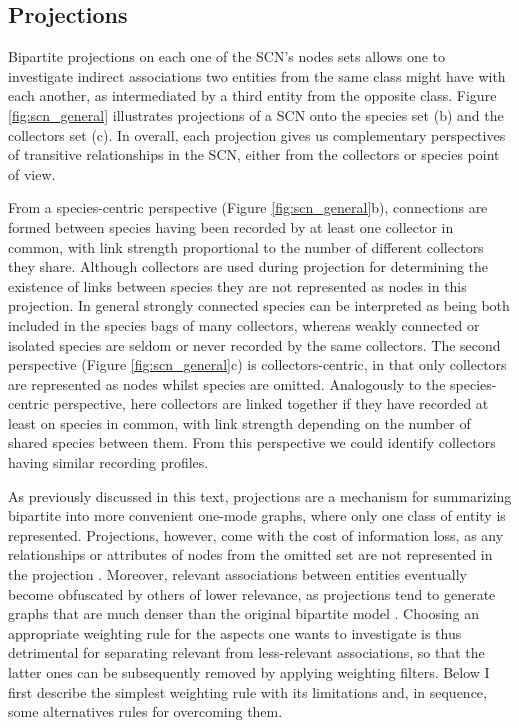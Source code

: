 \subsection{Projections}

Bipartite projections on each one of the SCN's nodes sets allows one to investigate indirect associations two entities from the same class might have with each another, as intermediated by a third entity from the opposite class. 
Figure \ref{fig:scn_general} illustrates projections of a SCN onto the species set (b) and the collectors set (c).
In overall, each projection gives us complementary perspectives of transitive relationships in the SCN, either from the collectors or species point of view.

From a species-centric perspective (Figure \ref{fig:scn_general}b), connections are formed between species having been recorded by at least one collector in common, with link strength proportional to the number of different collectors they share. 
Although collectors are used during projection for determining the existence of links between species they are not represented as nodes in this projection.
In general strongly connected species can be interpreted as being both included in the species bags of many collectors, whereas weakly connected or isolated species are seldom or never recorded by the same collectors.
The second perspective (Figure \ref{fig:scn_general}c) is collectors-centric, in that only collectors are represented as nodes whilst species are omitted. 
Analogously to the species-centric perspective, here collectors are linked together if they have recorded at least on species in common, with link strength depending on the number of shared species between them. 
From this perspective we could identify collectors having similar recording profiles.

As previously discussed in this text, projections are a mechanism for summarizing bipartite into more convenient one-mode graphs, where only one class of entity is represented. 
Projections, however, come with the cost of information loss, as any relationships or attributes of nodes from the omitted set are not represented in the projection \cite{Borgatti1997}. 
Moreover, relevant associations between entities eventually become obfuscated by others of lower relevance, as projections tend to generate graphs that are much denser than the original bipartite model \cite{Lambiotte2005}.
Choosing an appropriate weighting rule for the aspects one wants to investigate is thus detrimental for separating relevant from less-relevant associations, so that the latter ones can be subsequently removed by applying weighting filters.
Below I first describe the simplest weighting rule with its limitations and, in sequence, some alternatives rules for overcoming them.

